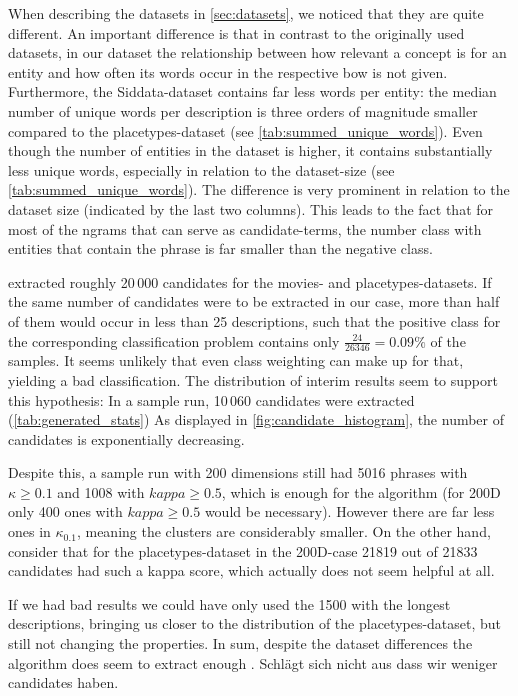 When describing the datasets in \autoref{sec:datasets}, we noticed that they are quite different. An important difference is that in contrast to the originally used datasets, in our dataset the relationship between how relevant a concept is for an entity and how often its words occur in the respective \gls{bow} is not given. Furthermore, the Siddata-dataset contains far less words per entity: the median number of unique words per description is three orders of magnitude smaller compared to the placetypes-dataset (see \autoref{tab:summed_unique_words}). Even though the number of entities in the dataset is higher, it contains substantially less unique words, especially in relation to the dataset-size (see \autoref{tab:summed_unique_words}). The difference is very prominent in relation to the dataset size (indicated by the last two columns). This leads to the fact that for most of the \glspl{ngram} that can serve as candidate-terms, the number class with entities that contain the phrase is far smaller than the negative class. 

\textcite{Derrac2015} extracted roughly 20\,000 candidates for the movies- and placetypes-datasets. If the same number of candidates were to be extracted in our case, more than half of them would occur in less than 25 descriptions, such that the positive class for the corresponding classification problem contains only $\frac{24}{26346}=0.09\%$ of the samples. It seems unlikely that even class weighting can make up for that, yielding a bad classification. The distribution of interim results seem to support this hypothesis: In a sample run, 10\,060 candidates were extracted (\autoref{tab:generated_stats}) As displayed in \autoref{fig:candidate_histogram}, the number of candidates is exponentially decreasing. 

Despite this, a sample run with 200 dimensions still had 5016 phrases with $\kappa \geq 0.1$ and 1008 with $kappa \geq 0.5$, which is enough for the algorithm (for 200D only 400 ones with $kappa \geq 0.5$ would be necessary). However there are far less ones in $\kappa_{0.1}$, meaning the clusters are considerably smaller. On the other hand, consider that for the placetypes-dataset in the 200D-case 21819 out of 21833 candidates had such a kappa score, which actually does not seem helpful at all.

If we had bad results we could have only used the 1500 with the longest descriptions, bringing us closer to the distribution of the placetypes-dataset, but still not changing the properties. In sum, despite the dataset differences the algorithm does seem to extract enough . Schlägt sich nicht aus dass wir weniger candidates haben. 





